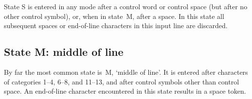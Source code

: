 \documentclass{book}
\begin{document}
State {\italic S} is entered in any mode after a control word or
control space (but after no other control symbol),
or, when in state~{\italic M}, after a space.
In this state all subsequent spaces or end-of-line characters
in this input line are discarded.

\subsection{State {\italic M}: middle of line}

By far the most common state is~{\italic M}, `middle of line'.
It is entered after characters of categories
1--4, 6--8, and 11--13, and after control symbols
other than control space.
An end-of-line character encountered in this state
results in a space token.


%

\begin{quotation}
  \figmouth
\end{quotation}
\end{document}
